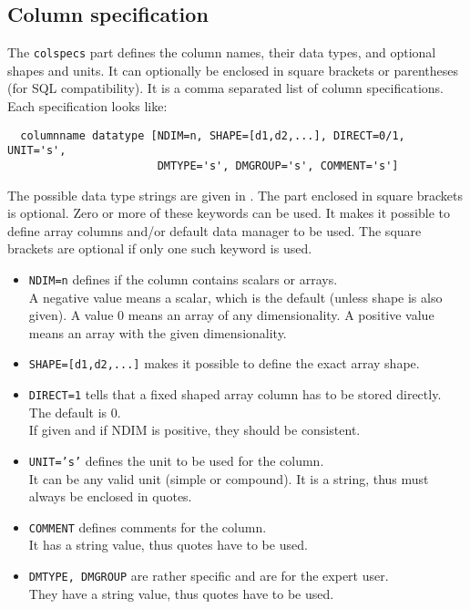 \subsection{Column specification}
The \texttt{colspecs} part defines the column names, their data types,
and optional shapes and units. It can optionally be enclosed in square
brackets or parentheses (for SQL compatibility).
It is a comma separated list of column specifications.
Each specification looks like:
\begin{verbatim}
  columnname datatype [NDIM=n, SHAPE=[d1,d2,...], DIRECT=0/1, UNIT='s',
                       DMTYPE='s', DMGROUP='s', COMMENT='s']
\end{verbatim}
The possible data type strings are given in
.
The part enclosed in square brackets is optional. Zero or more of
these keywords can be used. It makes it possible
to define array columns and/or default data manager to be used.
The square brackets are optional if only one such keyword is used.
\begin{itemize}
\item \texttt{NDIM=n} defines if the column contains scalars or arrays.
\\A negative value means a scalar, which is the default (unless shape is also given).
A value 0 means an array of any dimensionality. A positive value means
an array with the given dimensionality.
\item \texttt{SHAPE=[d1,d2,...]} makes it possible to define the exact
array shape.
\item \texttt{DIRECT=1} tells that a fixed shaped array column has to be
  stored directly. The default is 0.
\\If given and if NDIM is positive, they should be consistent.
\item \texttt{UNIT='s'} defines the unit to be used for the column.
\\It can be any valid unit (simple or compound). It is a string,
thus must always be enclosed in quotes. 
\item \texttt{COMMENT} defines comments for the column.
\\It has a string value, thus quotes
have to be used.
\item \texttt{DMTYPE, DMGROUP} are rather specific and are for the expert user.
\\They have a string value, thus quotes
have to be used.
\end{itemize}

